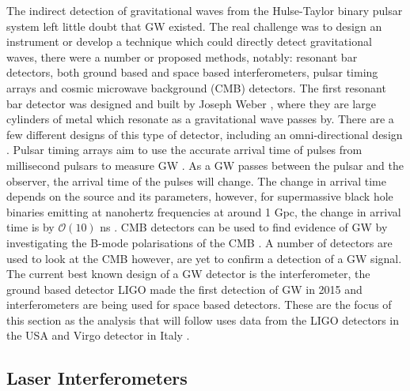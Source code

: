 The indirect detection of gravitational waves from the Hulse-Taylor binary
pulsar system \citep{weisberg1981GravitationalWaves} left little doubt that \gls{GW} existed.  The
real challenge was to design an instrument or develop a technique which could directly detect
gravitational waves, there were a number or proposed methods, notably: resonant bar detectors, both
ground based and space based interferometers, pulsar timing arrays and cosmic microwave background (CMB)
detectors. The first resonant bar detector was designed and built by Joseph
Weber \citep{weber1966ObservationThermal}, where they are large cylinders of metal
which resonate as a gravitational wave passes by.  There are a few different designs
of this type of detector, including an omni-directional design
\citep{dewaard2003MiniGRAILFirst}. 
Pulsar timing arrays aim to use the accurate arrival time of pulses
from millisecond pulsars to measure \gls{GW}
\citep{hobbs2017GravitationalWave}. As a \gls{GW} passes between the pulsar and
the observer, the arrival time of the pulses will change. The change in arrival time depends on the source and its parameters, however, for supermassive black hole binaries emitting at nanohertz frequencies at around 1 Gpc, the change in arrival time is by $\mathcal{O}(10)$ ns \citep{hobbs2017GravitationalWave}.  \gls{CMB} detectors can be used to find evidence of \gls{GW} by investigating the B-mode polarisations of the \gls{CMB}
\citep{ade2018ConstraintsPrimordial}.  A number of
detectors are used to look at the \gls{CMB} however, are yet to
confirm a detection of a \gls{GW} signal.  
The current best known design of a \gls{GW} detector is the interferometer, the ground based detector \gls{LIGO}
made the first detection of \gls{GW} in 2015
\citep{abbott2016ObservationGravitational} and interferometers are being used for space based detectors.  These are the focus of this
section as the analysis that will follow uses data from the \gls{LIGO}
detectors in the USA \citep{abbott2009LIGOLaser,aasi2015AdvancedLIGO} and Virgo
detector in Italy
\citep{acernese2015AdvancedVirgo,acernese2008StatusVirgo}.~ 

\subsection{Laser Interferometers}

